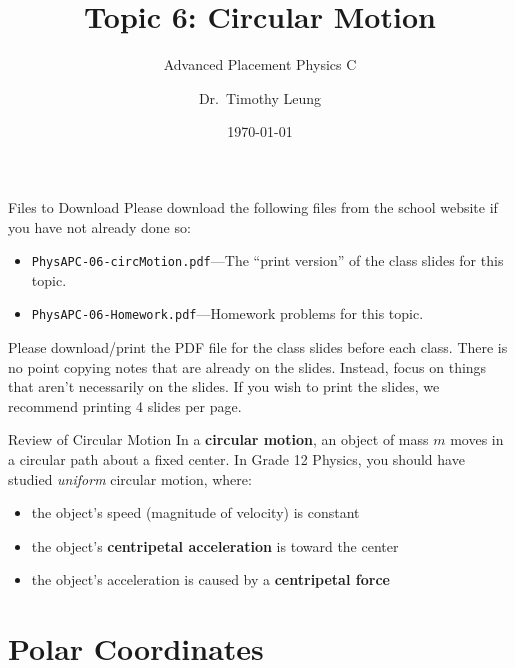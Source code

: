 \documentclass[12pt,compress,aspectratio=169]{beamer}
\title{Topic 6: Circular Motion}
\subtitle{Advanced Placement Physics C}
\author[TML]{Dr.\ Timothy Leung}
\institute{Olympiads School}
\date{\today}
\begin{document}
\begin{frame}
  \maketitle
\end{frame}


\begin{frame}{Files to Download}
  Please download the following files from the school website if you have not
  already done so:
  \begin{itemize}
  \item\texttt{PhysAPC-06-circMotion.pdf}---The ``print version'' of the
    class slides for this topic.
  \item\texttt{PhysAPC-06-Homework.pdf}---Homework problems for this topic.
  \end{itemize}
  \vspace{.1in}Please download/print the PDF file for the class slides before
  each class. There is no point copying notes that are already on the slides.
  Instead, focus on things that aren't necessarily on the slides. If you wish
  to print the slides, we recommend printing 4 slides per page.
\end{frame}



\begin{frame}{Review of Circular Motion}
  In a \textbf{circular motion}, an object of mass $m$ moves in a circular path
  about a fixed center. In Grade 12 Physics, you should have studied
  \emph{uniform} circular motion, where:
  \begin{itemize}
  \item the object's speed (magnitude of velocity) is constant
  \item the object's \textbf{centripetal acceleration} is toward the center
  \item the object's acceleration is caused by a \textbf{centripetal force}
  \end{itemize}
\end{frame}



\section{Polar Coordinates}
\end{document}
